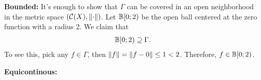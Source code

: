 \documentclass[12pt]{article}
\begin{document}
\begin{fproof}[1(a)]


    \textbf{Bounded:}
    It's enough to show that \(\Gamma\) can be covered in an open neighborhood in the metric space \((\mathcal{C}(X), \left\lVert \cdot \right\rVert)\).
    Let \(\mathbb{B}[0; 2)\) be the open ball centered at the zero function with a radius 2.
    We claim that 
    \begin{align*}
        \mathbb{B}[0; 2) \supseteq \Gamma.
    \end{align*}
    To see this, pick any \(f \in \Gamma\), then \(\left\lVert f \right\rVert = \left\lVert f - 0 \right\rVert \leq 1 < 2\).
    Therefore, \(f \in \mathbb{B}[0; 2)\).

    \textbf{Equicontinous:}
    

\end{fproof}

\begin{fproof}[1(b)]

\end{fproof}
\newpage

\begin{fproof}[2]

\end{fproof}
\newpage

\begin{fproof}[3(a)]
  
\end{fproof}

\begin{fproof}[3(b)]
  
\end{fproof}
\newpage

\begin{fproof}[4]

\end{fproof}
\newpage

\begin{fproof}[5]

\end{fproof}
\end{document}
